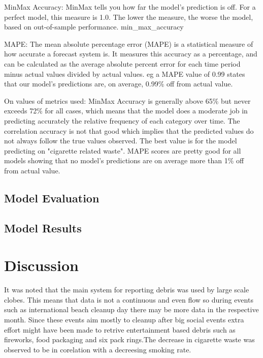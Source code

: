 \documentclass[10pt]{article}\usepackage[]{graphicx}\usepackage[]{color}
\begin{document}
MinMax Accuracy:
MinMax tells you how far the model's prediction is off. For a perfect model, this measure is 1.0. The lower the measure, the worse the model, based on out-of-sample performance.
min\_max\_accuracy

MAPE:
The mean absolute percentage error (MAPE) is a statistical measure of how accurate a forecast system is. It measures this accuracy as a percentage, and can be calculated as the average absolute percent error for each time period minus actual values divided by actual values. 
eg a MAPE value of 0.99 states that our model's predictions are, on average, 0.99\% off from actual value.

On values of metrics used:
MinMax Accuracy is generally above 65\% but never exceeds 72\% for all cases, which means that the model does a moderate job in predicting accurately the relative frequency of each category over time.
The correlation accuracy is not that good which implies that the predicted values do not always follow the true values observed. The best value is for the model predicting on "cigarette related waste".
MAPE scores are pretty good for all models showing that no model's predictions are on average more than 1\% off from actual value. 




\subsection{Model Evaluation}


\subsection{Model Results}




\pagebreak
\section{Discussion}

It was noted that the main system for reporting debris was used by large scale clobes. This means that data is not a continuous and even flow so during events such as international beach cleanup day there may be more data in the respective month. Since these events aim mostly to cleanup after big social events extra effort might have been made to retrive entertainment based debris such as fireworks, food packaging and six pack rings.The decrease in cigarette waste was observed to be in corelation with a decreesing smoking rate.
\end{document}
